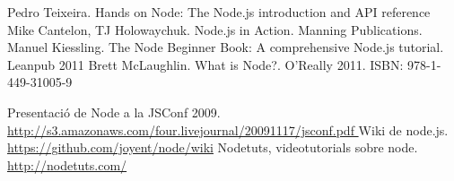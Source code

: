 
\begin{thebibliography}{9}

  Pedro Teixeira. Hands on Node: The Node.js introduction and API reference
  Mike Cantelon, TJ Holowaychuk. Node.js in Action. Manning Publications.
 Manuel Kiessling. The Node Beginner Book: A comprehensive Node.js tutorial. Leanpub 2011 
 Brett McLaughlin. What is Node?. O'Really 2011. ISBN: 978-1-449-31005-9 

 Presentació de Node a la JSConf 2009. \url{http://s3.amazonaws.com/four.livejournal/20091117/jsconf.pdf }
 Wiki de node.js. \url{https://github.com/joyent/node/wiki}
 Nodetuts, videotutorials sobre node. \url{http://nodetuts.com/}

\end{thebibliography}
